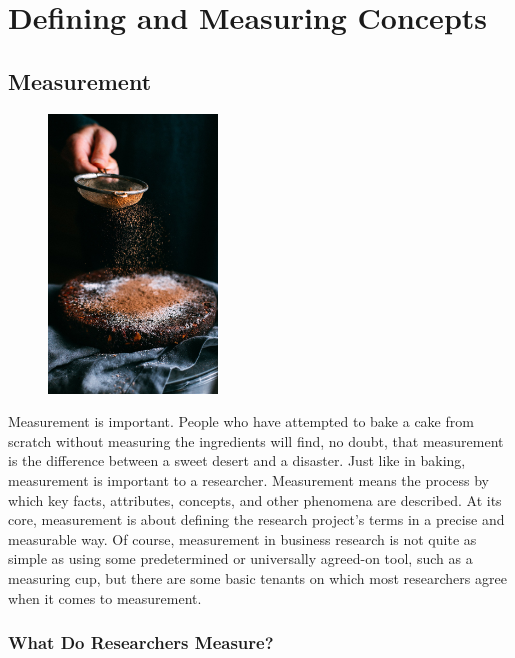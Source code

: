 \chapter{Defining and Measuring Concepts}\label{ch05:measuring}

\section{Measurement}

\begin{figure}
	\label{05:fig01} 
	\centering
	\includegraphics[width=0.4\textwidth]{gfx/05-cake} 
\end{figure}

Measurement is important. People who have attempted to bake a cake from scratch without measuring the ingredients will find, no doubt, that measurement is the difference between a sweet desert and a disaster. Just like in baking, measurement is important to a researcher. Measurement means the process by which key facts, attributes, concepts, and other phenomena are described. At its core, measurement is about defining the research project's terms in a precise and measurable way. Of course, measurement in business research is not quite as simple as using some predetermined or universally agreed-on tool, such as a measuring cup, but there are some basic tenants on which most researchers agree when it comes to measurement.


\subsection{What Do Researchers Measure?}

